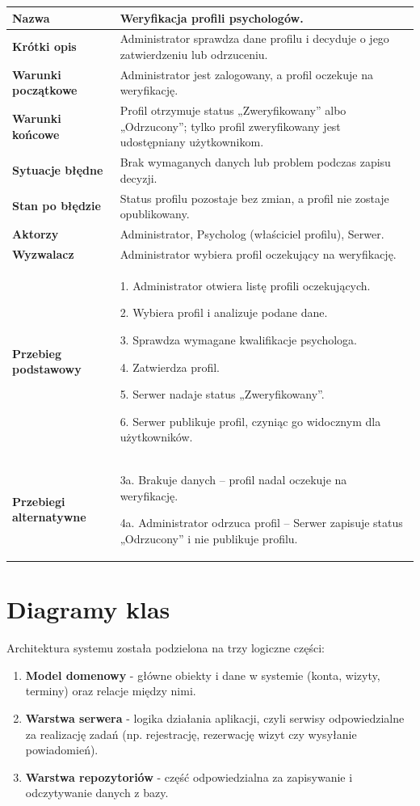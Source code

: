 \documentclass[11pt,a4paper]{article}
\newcommand{\pole}[2]{
\textbf{#1} & #2 \\ \hline
}
\begin{document}
\begin{tabularx}{\textwidth}{|p{3.9cm}|Y|}
\hline

\pole{Nazwa}{
Weryfikacja profili psychologów.
}

\pole{Krótki opis}{
Administrator sprawdza dane profilu
i decyduje o jego zatwierdzeniu
lub odrzuceniu.
}

\pole{Warunki początkowe}{
Administrator jest zalogowany, a profil oczekuje
na weryfikację.
}

\pole{Warunki końcowe}{
Profil otrzymuje status „Zweryfikowany”
albo „Odrzucony”; tylko profil
zweryfikowany jest udostępniany użytkownikom.
}

\pole{Sytuacje błędne}{
Brak wymaganych danych
lub problem podczas zapisu decyzji.
}

\pole{Stan po błędzie}{
Status profilu pozostaje bez zmian,
a profil nie zostaje opublikowany.
}

\pole{Aktorzy}{
Administrator,
Psycholog (właściciel profilu),
Serwer.
}

\pole{Wyzwalacz}{
Administrator wybiera profil oczekujący na weryfikację.
}

\pole{Przebieg podstawowy}{
1. Administrator otwiera listę
profili oczekujących.\par
2. Wybiera profil i analizuje podane dane.\par
3. Sprawdza wymagane kwalifikacje psychologa.\par
4. Zatwierdza profil.\par
5. Serwer nadaje status „Zweryfikowany”.\par
6. Serwer publikuje profil, czyniąc go widocznym dla użytkowników.
}

\pole{Przebiegi alternatywne}{
3a. Brakuje danych --
profil nadal oczekuje na weryfikację.\par
4a. Administrator odrzuca profil --
Serwer zapisuje status „Odrzucony”
i nie publikuje profilu.
}

\end{tabularx}
\endgroup

\clearpage
\section*{Diagramy klas}

Architektura systemu została podzielona na trzy logiczne części:

\begin{enumerate}
    \item \textbf{Model domenowy} - główne obiekty i dane w systemie (konta, wizyty, terminy) oraz relacje między nimi.
    \item \textbf{Warstwa serwera} - logika działania aplikacji, czyli serwisy odpowiedzialne za realizację zadań (np. rejestrację, rezerwację wizyt czy wysyłanie powiadomień).
    \item \textbf{Warstwa repozytoriów} - część odpowiedzialna za zapisywanie i odczytywanie danych z bazy.
\end{enumerate}
\end{document}
